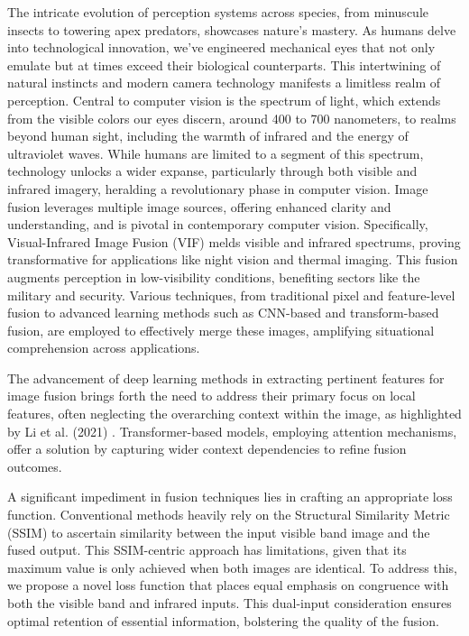 \label{chp:introduction}
The intricate evolution of perception systems across species, from minuscule insects to towering apex predators, showcases nature's mastery. As humans delve into technological innovation, we've engineered mechanical eyes that not only emulate but at times exceed their biological counterparts. This intertwining of natural instincts and modern camera technology manifests a limitless realm of perception. Central to computer vision is the spectrum of light, which extends from the visible colors our eyes discern, around 400 to 700 nanometers, to realms beyond human sight, including the warmth of infrared and the energy of ultraviolet waves. While humans are limited to a segment of this spectrum, technology unlocks a wider expanse, particularly through both visible and infrared imagery, heralding a revolutionary phase in computer vision. Image fusion leverages multiple image sources, offering enhanced clarity and understanding, and is pivotal in contemporary computer vision. Specifically, Visual-Infrared Image Fusion (VIF) melds visible and infrared spectrums, proving transformative for applications like night vision and thermal imaging. This fusion augments perception in low-visibility conditions, benefiting sectors like the military and security. Various techniques, from traditional pixel and feature-level fusion to advanced learning methods such as CNN-based and transform-based fusion, are employed to effectively merge these images, amplifying situational comprehension across applications.

The advancement of deep learning methods in extracting pertinent features for image fusion brings forth the need to address their primary focus on local features, often neglecting the overarching context within the image, as highlighted by Li et al. (2021) \cite{li2021rfn}. Transformer-based models, employing attention mechanisms, offer a solution by capturing wider context dependencies to refine fusion outcomes.

A significant impediment in fusion techniques lies in crafting an appropriate loss function. Conventional methods heavily rely on the Structural Similarity Metric (SSIM) to ascertain similarity between the input visible band image and the fused output. This SSIM-centric approach has limitations, given that its maximum value is only achieved when both images are identical. To address this, we propose a novel loss function that places equal emphasis on congruence with both the visible band and infrared inputs. This dual-input consideration ensures optimal retention of essential information, bolstering the quality of the fusion.

